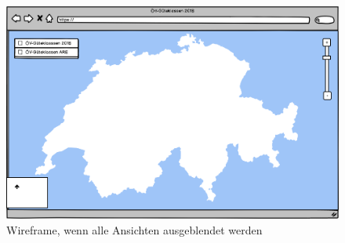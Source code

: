\begin{figure}[p]
    \centering
    \includegraphics[width=0.8\linewidth]{projectdoc/img/wireframes/deselected.png}
    \caption[Wireframe, wenn alle Ansichten ausgeblendet werden]{Wireframe, wenn alle Ansichten ausgeblendet werden}
    \label{fig:wireframe_delesected}
\end{figure}